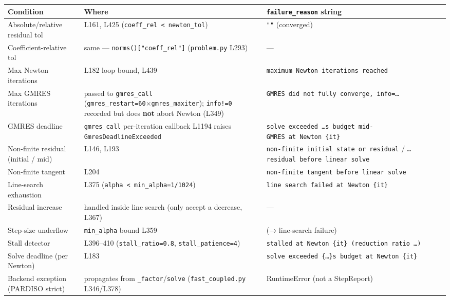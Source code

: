 \documentclass[
  10pt,
]{article}
\newcounter{none} %
\begin{document}
{\def\LTcaptype{none} %
\begin{longtable}[]{@{}
  >{\raggedright\arraybackslash}p{}
  >{\raggedright\arraybackslash}p{}
  >{\raggedright\arraybackslash}p{}@{}}
\toprule\noalign{}
\begin{minipage}[b]{\linewidth}\raggedright
Condition
\end{minipage} & \begin{minipage}[b]{\linewidth}\raggedright
Where
\end{minipage} & \begin{minipage}[b]{\linewidth}\raggedright
\texttt{failure\_reason} string
\end{minipage} \\
\midrule\noalign{}
\endhead
\bottomrule\noalign{}
\endlastfoot
Absolute/relative residual tol & L161, L425
(\texttt{coeff\_rel\ \textless{}\ newton\_tol}) & \texttt{""}
(converged) \\
Coefficient-relative tol & same --- \texttt{norms(){[}"coeff\_rel"{]}}
(\texttt{problem.py} L293) & --- \\
Max Newton iterations & L182 loop bound, L439 &
\texttt{maximum\ Newton\ iterations\ reached} \\
Max GMRES iterations & passed to \texttt{gmres\_call}
(\texttt{gmres\_restart=60}×\texttt{gmres\_maxiter}); \texttt{info!=0}
recorded but does \textbf{not} abort Newton (L349) &
\texttt{GMRES\ did\ not\ fully\ converge,\ info=…} \\
GMRES deadline & \texttt{gmres\_call} per-iteration callback L1194
raises \texttt{GmresDeadlineExceeded} &
\texttt{solve\ exceeded\ …s\ budget\ mid-GMRES\ at\ Newton\ \{it\}} \\
Non-finite residual (initial / mid) & L146, L193 &
\texttt{non-finite\ initial\ state\ or\ residual} /
\texttt{…residual\ before\ linear\ solve} \\
Non-finite tangent & L204 &
\texttt{non-finite\ tangent\ before\ linear\ solve} \\
Line-search exhaustion & L375
(\texttt{alpha\ \textless{}\ min\_alpha=1/1024}) &
\texttt{line\ search\ failed\ at\ Newton\ \{it\}} \\
Residual increase & handled inside line search (only accept a decrease,
L367) & --- \\
Step-size underflow & \texttt{min\_alpha} bound L359 & (→ line-search
failure) \\
Stall detector & L396--410 (\texttt{stall\_ratio=0.8},
\texttt{stall\_patience=4}) &
\texttt{stalled\ at\ Newton\ \{it\}\ (reduction\ ratio\ …)} \\
Solve deadline (per Newton) & L183 &
\texttt{solve\ exceeded\ \{…\}s\ budget\ at\ Newton\ \{it\}} \\
Backend exception (PARDISO strict) & propagates from
\texttt{\_factor}/\texttt{solve} (\texttt{fast\_coupled.py} L346/L378) &
RuntimeError (not a StepReport) \\
\end{longtable}
}
\end{document}
